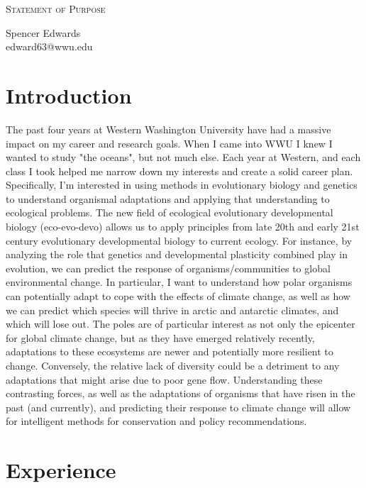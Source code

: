 \documentclass[letterpaper]{article}
\makeatletter
\newcommand{\soptitle}{Statement of Purpose}
\newcommand{\yourname}{Spencer Edwards}
\newcommand{\youremail}{edward63@wwu.edu}
\newcommand{\amper}{{\fontspec[Scale=.95]{Adobe Caslon Pro}\selectfont\itshape\&~{}}}
\makeatother
\begin{document}
\begin{center}{\huge \scshape \soptitle}\end{center}
\begin{center}\vspace{0.2em} {\Large \yourname\\}
  {\youremail}\end{center}

\section*{Introduction}
The past four years at Western Washington University have had a massive impact 
on my career and research goals. When I came into WWU I knew I wanted to study 
"the oceans", but not much else. Each year at Western, and each class I took 
helped me narrow down my interests and create a solid career plan. 
Specifically, I'm interested in using methods in evolutionary biology and genetics 
to understand organismal adaptations and applying that understanding to ecological problems. The new field of ecological evolutionary developmental biology
(eco-evo-devo) allows us to apply principles from late 20th and early 21st century evolutionary developmental biology to current ecology. For instance, by analyzing the role
that genetics and developmental plasticity combined play in evolution, we can predict the response of organisms/communities 
to global environmental change.
In particular, I want to understand how polar organisms can potentially adapt to cope with the effects of climate change,
as well as how we can predict which species will thrive in arctic and antarctic climates, and which will lose out. 
The poles are of particular interest as not only the 
epicenter for global climate change, but as they have emerged relatively recently, 
adaptations to these ecosystems are newer and potentially more resilient to change. Conversely, the relative lack of diversity could be a detriment to
any adaptations that might arise due to poor gene flow.  
Understanding these contrasting forces, as well as the adaptations of organisms that have risen in the past (and currently), and predicting their response to climate 
change will allow for intelligent methods for conservation and policy recommendations. 
\section*{Experience}
\end{document}

